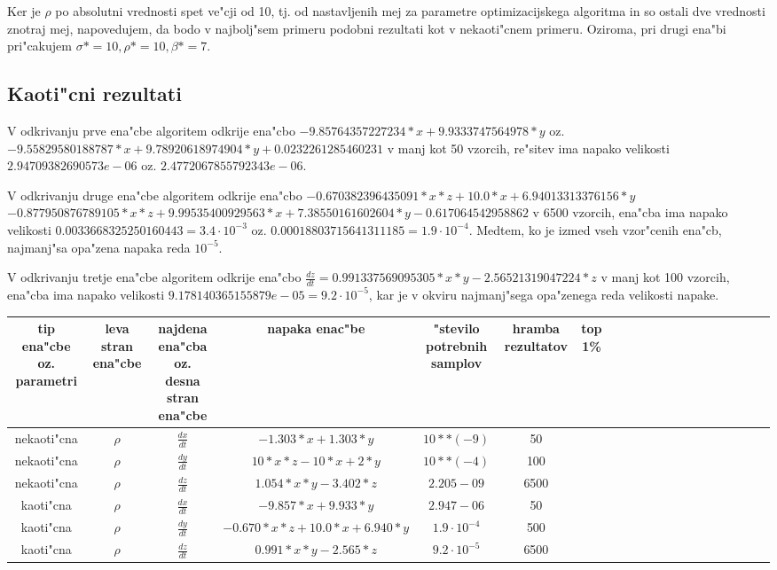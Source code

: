 \documentclass[10pt,a4paper]{article}
\begin{document}
Ker je $\rho$ po absolutni vrednosti spet ve"cji od 10, tj. od nastavljenih 
mej za parametre optimizacijskega algoritma in so ostali dve vrednosti 
znotraj mej, napovedujem, da bodo v najbolj"sem primeru podobni rezultati kot 
v nekaoti"cnem primeru. Oziroma, pri drugi ena"bi pri"cakujem 
$\sigma* = 10, \rho*= 10, \beta*=7$. 


\subsection{Kaoti"cni rezultati}

V odkrivanju prve ena"cbe algoritem odkrije ena"cbo
$-9.85764357227234*x + 9.9333747564978*y$ oz. 
$-9.55829580188787*x + 9.78920618974904*y + 0.0232261285460231$
v manj kot 50 vzorcih, re"sitev ima napako velikosti
$2.94709382690573e-06$ oz. $2.4772067855792343e-06$.

V odkrivanju druge ena"cbe algoritem odkrije ena"cbo
$ -0.670382396435091*x*z + 10.0*x + 6.94013313376156*y $  
$ -0.877950876789105*x*z + 9.99535400929563*x + 7.38550161602604*y - 0.617064542958862 $ 
v 6500 vzorcih, ena"cba ima napako velikosti
$0.0033668325250160443 = 3.4\cdot 10^ {-3}$ oz. $0.00018803715641311185 = 1.9\cdot 10^ {-4}$.
Medtem, ko je izmed vseh vzor"cenih ena"cb, najmanj"sa opa"zena napaka
reda $10^ {-5}$.

V odkrivanju tretje ena"cbe algoritem odkrije ena"cbo
$\frac{dz}{dt} = 0.991337569095305*x*y - 2.56521319047224*z$ 
v manj kot 100 vzorcih, ena"cba ima napako velikosti
$9.178140365155879e-05 = 9.2\cdot 10^ {-5}$,
kar je v okviru najmanj"sega opa"zenega reda velikosti napake.


\begin{table}[h]
	\begin{tabular}{*{15}{c|}ccccc}
		\multicolumn{1}{p{1cm}|}{tip ena"cbe oz. parametri} & 
		\multicolumn{1}{p{1cm}|}{leva stran ena"cbe} &
		 \multicolumn{1}{p{1.3cm}|}{najdena ena"cba oz. desna stran ena"cbe} &
		  \multicolumn{1}{p{3cm}|}{napaka enac"be} &
		   \multicolumn{1}{p{1cm}|}{"stevilo potrebnih samplov} & 
		   \multicolumn{1}{p{1cm}|}{hramba rezultatov} & \multicolumn{1}{p{1cm}|}{top 1\%} \\
		   \hline
		nekaoti"cna & $\rho$ & $\frac{dx}{dt}$ & $ -1.303*x + 1.303*y $ & $10**(-9)$ & 50 & &  \\
		nekaoti"cna & $\rho$ & $\frac{dy}{dt}$ & $10*x*z -10*x +2*y$ & $10**(-4)$ & 100 &  \\
		nekaoti"cna & $\rho$ & $\frac{dz}{dt}$ & $1.054*x*y - 3.402*z$ & $2.205-09$ & 6500 \\
		\hline
		kaoti"cna & $\rho$ & $\frac{dx}{dt}$ & $-9.857*x + 9.933*y$ & $2.947-06$  & 50 \\
		kaoti"cna & $\rho$ & $\frac{dy}{dt}$ & $ -0.670*x*z + 10.0*x + 6.940*y $ & $ 1.9\cdot 10^ {-4}$ & 500 \\
		kaoti"cna & $\rho$ & $\frac{dz}{dt}$ & $0.991*x*y - 2.565*z$ & $9.2\cdot 10^ {-5}$ & 6500 \\

	\end{tabular}
\end{table}
\end{document}

